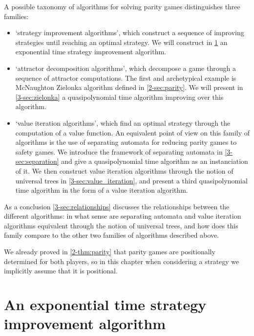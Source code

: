 

A possible taxonomy of algorithms for solving parity games distinguishes three families:
\begin{itemize}
	\item `strategy improvement algorithms', which construct a sequence of improving strategies until reaching an optimal strategy. 
	We will construct in \cref{3-sec:strategy_improvement} an exponential time strategy improvement algorithm.
	
	\item `attractor decomposition algorithms', which decompose a game through a sequence of attractor computations. 
	The first and archetypical example is McNaughton Zielonka algorithm defined in \cref{2-sec:parity}. 
	We will present in \cref{3-sec:zielonka} a quasipolynomial time algorithm improving over this algorithm.

	\item `value iteration algorithms', which find an optimal strategy through the computation of a value function.
	An equivalent point of view on this family of algorithms is the use of separating automata for reducing parity games to safety games.
	We introduce the framework of separating automata in \cref{3-sec:separation} and give a quasipolynomial time algorithm as an instanciation of it. 
	We then construct value iteration algorithms through the notion of universal trees in \cref{3-sec:value_iteration},
	and present a third quasipolynomial time algorithm in the form of a value iteration algorithm.
\end{itemize}

As a conclusion \cref{3-sec:relationships} discusses the relationships between the different algorithms: in what sense are separating automata and value iteration algorithms equivalent through the notion of universal trees, and how does this family compare to the other two families of algorithms described above.

\begin{remark}
We already proved in \cref{2-thm:parity} that parity games are positionally determined for both players, so in this chapter when considering a strategy we implicitly assume that it is positional.
\end{remark}


\section{An exponential time strategy improvement algorithm}
\label{3-sec:strategy_improvement}


